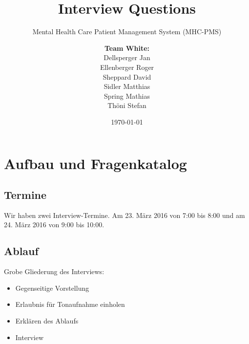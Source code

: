 \documentclass[a4paper]{scrartcl}
\title{Interview Questions}
\subtitle{Mental Health Care Patient Management System (MHC-PMS)}
\author{
\begin{tabular}{l}
\normalfont\bfseries{Team White:}\\
Dellsperger Jan\\
Ellenberger Roger\\
Sheppard David\\
Sidler Matthias\\
Spring Mathias\\
Thöni Stefan
\end{tabular}
}
\date{\today}
\begin{document}
\begin{titlepage}
	\maketitle
\end{titlepage}

\section{Aufbau und Fragenkatalog}

\subsection{Termine}
Wir haben zwei Interview-Termine. Am 23. März 2016 von 7:00 bis 8:00 und am 24. März 2016 von 9:00 bis 10:00.

\subsection{Ablauf}
Grobe Gliederung des Interviews:
\begin{itemize}
\item Gegenseitige Vorstellung
\item Erlaubnis für Tonaufnahme einholen
\item Erklären des Ablaufs
\item Interview
\end{itemize}
\end{document}
